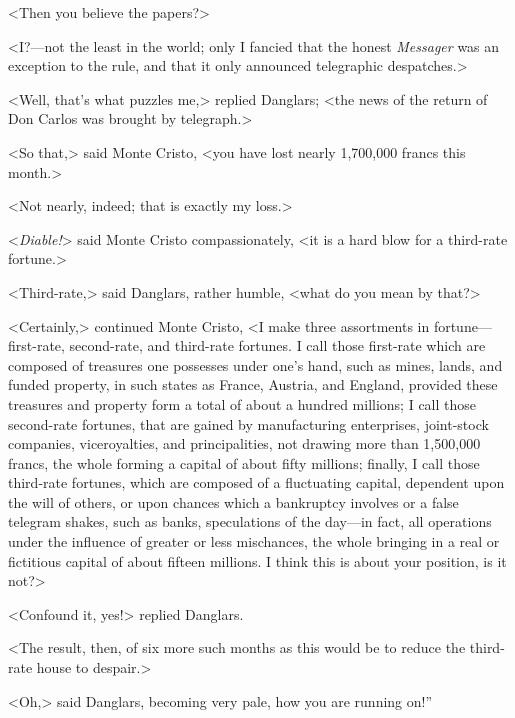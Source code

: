  <Then you believe the papers?> 

 <I?—not the least in the world; only I fancied that the honest \textit{Messager} was an exception to the rule, and that it only announced telegraphic despatches.> 

 <Well, that's what puzzles me,> replied Danglars; <the news of the return of Don Carlos was brought by telegraph.> 

 <So that,> said Monte Cristo, <you have lost nearly 1,700,000 francs this month.> 

 <Not nearly, indeed; that is exactly my loss.> 

 <\textit{Diable!}> said Monte Cristo compassionately, <it is a hard blow for a third-rate fortune.> 

 <Third-rate,> said Danglars, rather humble, <what do you mean by that?> 

 <Certainly,> continued Monte Cristo, <I make three assortments in fortune—first-rate, second-rate, and third-rate fortunes. I call those first-rate which are composed of treasures one possesses under one's hand, such as mines, lands, and funded property, in such states as France, Austria, and England, provided these treasures and property form a total of about a hundred millions; I call those second-rate fortunes, that are gained by manufacturing enterprises, joint-stock companies, viceroyalties, and principalities, not drawing more than 1,500,000 francs, the whole forming a capital of about fifty millions; finally, I call those third-rate fortunes, which are composed of a fluctuating capital, dependent upon the will of others, or upon chances which a bankruptcy involves or a false telegram shakes, such as banks, speculations of the day—in fact, all operations under the influence of greater or less mischances, the whole bringing in a real or fictitious capital of about fifteen millions. I think this is about your position, is it not?> 

 <Confound it, yes!> replied Danglars. 

 <The result, then, of six more such months as this would be to reduce the third-rate house to despair.> 

 <Oh,> said Danglars, becoming very pale, how you are running on!” 

